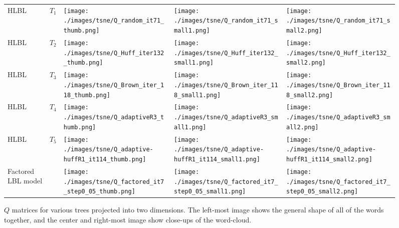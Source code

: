 \begin{figure}[p]
\centering
\begin{tabular}{@{}m{1cm}m{1cm}m{3.5cm}m{3.5cm}m{3.5cm}@{}}
HLBL & $T_1$ &
\texttt{[image: ./images/tsne/Q\_random\_it71\_thumb.png]} &
\texttt{[image: ./images/tsne/Q\_random\_it71\_small1.png]} &
\texttt{[image: ./images/tsne/Q\_random\_it71\_small2.png]}
\\
HLBL & $T_2$ &
\texttt{[image: ./images/tsne/Q\_Huff\_iter132\_thumb.png]} &
\texttt{[image: ./images/tsne/Q\_Huff\_iter132\_small1.png]} &
\texttt{[image: ./images/tsne/Q\_Huff\_iter132\_small2.png]}
\\
HLBL &$T_3$ &
\texttt{[image: ./images/tsne/Q\_Brown\_iter\_118\_thumb.png]} &
\texttt{[image: ./images/tsne/Q\_Brown\_iter\_118\_small1.png]} &
\texttt{[image: ./images/tsne/Q\_Brown\_iter\_118\_small2.png]}
\\
HLBL & $T_4$ &
\texttt{[image: ./images/tsne/Q\_adaptiveR3\_thumb.png]} &
\texttt{[image: ./images/tsne/Q\_adaptiveR3\_small1.png]} &
\texttt{[image: ./images/tsne/Q\_adaptiveR3\_small2.png]}
\\
HLBL & $T_5$ &
\texttt{[image: ./images/tsne/Q\_adaptive-huffR1\_it114\_thumb.png]} &
\texttt{[image: ./images/tsne/Q\_adaptive-huffR1\_it114\_small1.png]} &
\texttt{[image: ./images/tsne/Q\_adaptive-huffR1\_it114\_small2.png]}
\\
Factored LBL model &&
\texttt{[image: ./images/tsne/Q\_factored\_it7\_step0\_05\_thumb.png]} &
\texttt{[image: ./images/tsne/Q\_factored\_it7\_step0\_05\_small1.png]} &
\texttt{[image: ./images/tsne/Q\_factored\_it7\_step0\_05\_small2.png]}
\end{tabular}
\caption{$Q$ matrices for various trees projected into two dimensions. The left-most image shows the general shape of all of the words together, and the center and right-most image show close-ups of the word-cloud.}
\label{fig:Qcloud}
\end{figure}

